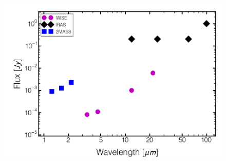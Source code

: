     \begin{figure}
    \centering
    \includegraphics[scale=0.5]{Ch2/flux_density_comparison}
    \caption[]{}
    \label{fig:flux_comparison}
    \end{figure}
    
    
    
    
    
    
    
    